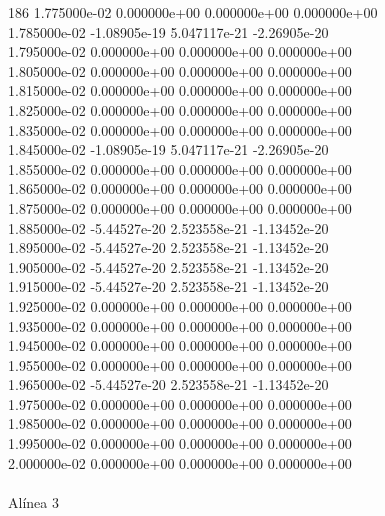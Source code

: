 186	1.775000e-02	0.000000e+00	0.000000e+00	0.000000e+00	\\ 	1.785000e-02	-1.08905e-19	5.047117e-21	-2.26905e-20	\\ 	1.795000e-02	0.000000e+00	0.000000e+00	0.000000e+00	\\ 	1.805000e-02	0.000000e+00	0.000000e+00	0.000000e+00	\\ 	1.815000e-02	0.000000e+00	0.000000e+00	0.000000e+00	\\ 	1.825000e-02	0.000000e+00	0.000000e+00	0.000000e+00	\\ 	1.835000e-02	0.000000e+00	0.000000e+00	0.000000e+00	\\ 	1.845000e-02	-1.08905e-19	5.047117e-21	-2.26905e-20	\\ 	1.855000e-02	0.000000e+00	0.000000e+00	0.000000e+00	\\ 	1.865000e-02	0.000000e+00	0.000000e+00	0.000000e+00	\\ 	1.875000e-02	0.000000e+00	0.000000e+00	0.000000e+00	\\ 	1.885000e-02	-5.44527e-20	2.523558e-21	-1.13452e-20	\\ 	1.895000e-02	-5.44527e-20	2.523558e-21	-1.13452e-20	\\ 	1.905000e-02	-5.44527e-20	2.523558e-21	-1.13452e-20	\\ 	1.915000e-02	-5.44527e-20	2.523558e-21	-1.13452e-20	\\ 	1.925000e-02	0.000000e+00	0.000000e+00	0.000000e+00	\\ 	1.935000e-02	0.000000e+00	0.000000e+00	0.000000e+00	\\ 	1.945000e-02	0.000000e+00	0.000000e+00	0.000000e+00	\\ 	1.955000e-02	0.000000e+00	0.000000e+00	0.000000e+00	\\ 	1.965000e-02	-5.44527e-20	2.523558e-21	-1.13452e-20	\\ 	1.975000e-02	0.000000e+00	0.000000e+00	0.000000e+00	\\ 	1.985000e-02	0.000000e+00	0.000000e+00	0.000000e+00	\\ 	1.995000e-02	0.000000e+00	0.000000e+00	0.000000e+00	\\ 	2.000000e-02	0.000000e+00	0.000000e+00	0.000000e+00	\\ \hline
\\ \hline
                                   Alínea 3 \\ \hline
